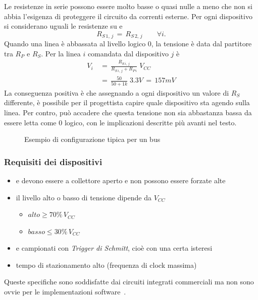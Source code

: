 Le resistenze in serie possono essere molto basse o quasi nulle
a meno che non si abbia l'esigenza di proteggere il circuito da correnti esterne.
Per ogni dispositivo si considerano uguali le resistenze su {\sda} e {\scl}
\begin{equation}
	R_{S\,1,\,j}\,=\,R_{S\,2,\,j}\qquad \forall i.
\label{eqn:rs}
\end{equation}
Quando una linea è abbassata al livello logico \textsc{0},
la tensione è data dal partitore tra $R_P$ e $R_S$.
Per la linea $i$ comandata dal dispositivo $j$ è
\begin{align}
	V_{i}\,&=\,\frac{R_{S\,i,\,j}}{R_{S\,i,\,j}+R_{P\,i}}\;V_{CC} \\
    & =\,\frac{50}{50+1k}\;3.3V \,=\,157mV
\label{eqn:partitore}
\end{align}
La conseguenza positiva è che assegnando a ogni dispositivo un valore di $R_S$ differente,
è possibile per il progettista capire quale dispositivo sta agendo sulla linea.
Per contro, può accadere che questa tensione non sia abbastanza bassa da essere letta come \textsc{0} logico,
con le implicazioni descritte più avanti nel testo.

\begin{figure}
  \centering
  \resizebox{.9\linewidth}{!}{}
  \caption{Esempio di configurazione tipica per un bus \iic}
  \label{fig:i2c_tipica}
\end{figure}



\subsubsection{Requisiti dei dispositivi}
\begin{itemize}
  \item {\sda{} e \scl{} devono essere a collettore aperto e non possono essere forzate alte}
  \item {il livello alto o basso di tensione dipende da $V_{CC}$}
  \begin{itemize}
	\item {\(alto \geq 70\%\,V_{CC}\)} 
	\item {\(basso \leq 30\%\,V_{CC}\)}
  \end{itemize}
  \item {\sda{} e \scl{} campionati con \emph{Trigger di Schmitt}, cioè con una certa isteresi}
  \item {tempo di stazionamento alto (frequenza di clock massima)}
\end{itemize}
Queste specifiche sono soddisfatte dai circuiti integrati commerciali
ma non sono ovvie per le implementazioni software~\cite{cit:primer}.

